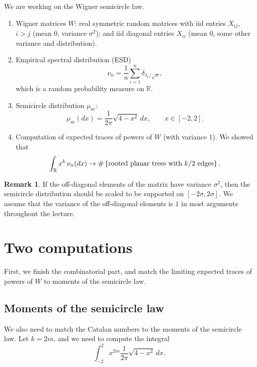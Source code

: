 \documentclass[letterpaper,11pt,oneside,reqno]{book}
\numberwithin{equation}{chapter}  %
\theoremstyle{definition}
\newtheorem{remark}[proposition]{Remark}
\begin{document}
We are working on the Wigner semicircle law.
\begin{enumerate}
	\item Wigner matrices $W$:
		real symmetric random matrices with iid entries
		$X_{ij}$, $i>j$ (mean 0, variance $\sigma^2$);
		and iid diagonal entries $X_{ii}$ (mean 0, some other variance and distribution).
	\item Empirical spectral distribution (ESD)
		\begin{equation*}
			\nu_n = \frac{1}{n} \sum_{i=1}^{n} \delta_{\lambda_i/\sqrt{n}},
		\end{equation*}
		which is a random probability measure on $\mathbb{R}$.
	\item Semicircle distribution $\mu_{\mathrm{sc}}$:
		\begin{equation*}
			\mu_{\mathrm{sc}}(dx) = \frac{1}{2\pi} \sqrt{4-x^2} \, dx,
			\qquad x \in [-2,2].
		\end{equation*}
	\item Computation of expected traces of powers of $W$
		(with variance $1$). We
		showed that
		\begin{equation*}
		\int_{\mathbb{R}} x^k \, \nu_n(dx) \to
			\#\left\{ \textnormal{rooted planar trees with $k/2$ edges} \right\}.
		\end{equation*}
\end{enumerate}

\begin{remark}
	If the off-diagonal elements of the matrix have variance $\sigma^2$, then the
	semicircle distribution should be scaled to be supported on $[-2\sigma,2\sigma]$.
	We assume that the variance of the off-diagonal elements is $1$
	in most arguments throughout the lecture.
\end{remark}

\section{Two computations}

First, we finish the combinatorial part,
and match the limiting expected traces of powers of $W$
to moments of the semicircle law.

\subsection{Moments of the semicircle law}

We also need to match the Catalan numbers to the moments of the semicircle law.
Let $k=2m$, and we need to compute
the integral
\begin{equation*}
	\int_{-2}^{2} x^{2m} \frac{1}{2\pi} \sqrt{4-x^2} \, dx.
\end{equation*}
\end{document}
